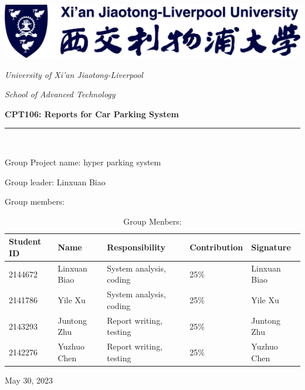 
\thispagestyle{fancy}
\fancyfoot{}
\renewcommand{\headrulewidth}{0pt}

\begin{center}
	\includegraphics*[scale = 0.3]{pics/XJTLU.png}\par
	\slshape{\LARGE University of Xi'an Jiaotong-Liverpool}\\[2.5ex]\par
	\hfill\par
	\slshape{\Large School of Advanced Technology}\\[10ex]\par
	\hfill
	
	\textsf{\textup{\Huge \bfseries CPT106: Reports for Car Parking System }}\\[2ex]\par
	\noindent \rule[-1ex]{\textwidth}{2.5pt}\\[10ex]

	 {
		\setlength{\leftskip}{3em}
		\setlength{\rightskip}{3em}
		\Large Group Project name: \hfill hyper parking system\\[0.8ex]\par
		\textup{\Large Group leader: \hfill Linxuan Biao}\\[0.8ex]\par
		\textup{\Large Group members: \hfill\hfill}\par
	 }
\begin{table}[h!]
	\begin{center}
		\caption{Group Menbers:}
		\begin{tabular}{l|l|l|l|l} %
			\hline
			\textbf{Student ID} & \textbf{Name} & \textbf{Responsibility} & \textbf{Contribution} & \textbf{Signature} \\
			\hline
	2144672 & Linxuan Biao  & System analysis, coding & 25\% &Linxuan Biao\\\hline
	2141786 & Yile Xu       & System analysis, coding & 25\% &Yile Xu     \\\hline
	2143293 & Juntong Zhu   & Report writing, testing & 25\% &Juntong Zhu \\\hline
	2142276 & Yuzhuo Chen   & Report writing, testing & 25\% &Yuzhuo Chen \\\hline
		\end{tabular}
	\end{center}
\end{table}
	\noindent \textup{\Large May 30, 2023}
\end{center}
\clearpage

\endinput
